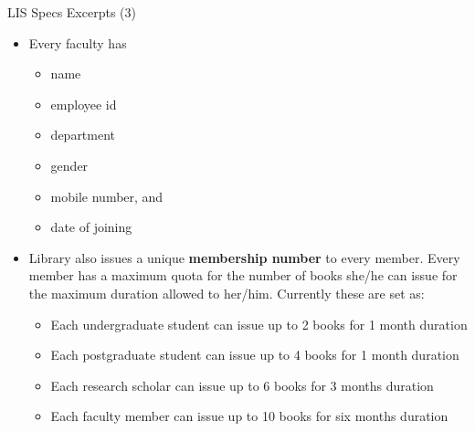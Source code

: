 \documentclass[aspectratio=169, xcolor=dvipsnames]{beamer}
\begin{document}
\begin{frame}{LIS Specs Excerpts (3)}
    \begin{itemize}
        \item Every faculty has
        \begin{itemize}
            \item name
            \item employee id
            \item department
            \item gender
            \item mobile number, and
            \item date of joining
        \end{itemize}
        \item Library also issues a unique \textbf{membership number} to every member. Every member has a maximum quota for the number of books she/he can issue for the maximum duration allowed to her/him. Currently these are set as:
        \begin{itemize}
            \item Each undergraduate student can issue up to 2 books for 1 month duration
            \item Each postgraduate student can issue up to 4 books for 1 month duration
            \item Each research scholar can issue up to 6 books for 3 months duration
            \item Each faculty member can issue up to 10 books for six months duration
        \end{itemize}
    \end{itemize}
\end{frame}
\end{document}
